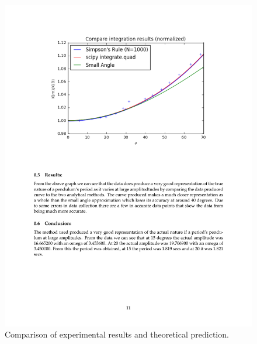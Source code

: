 \documentclass[journal, a4paper]{IEEEtran}
\begin{document}
	\begin{figure}[!hbt]
		\begin{center}
		\includegraphics[width=\columnwidth]{pendulum}
		\caption{Comparison of experimental results and theoretical prediction.}
		\label{fig:tf_plot}
		\end{center}
	\end{figure}

\printbibliography[title={References}]

\end{document}
